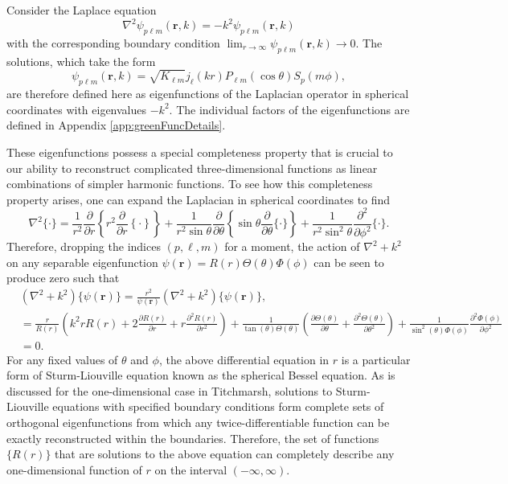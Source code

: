 \documentclass{article}
\begin{document}
Consider the Laplace equation
\begin{equation}
\nabla^2\psi_{p\ell m}(\mathbf{r},k) = -k^2\psi_{p\ell m}(\mathbf{r},k)
\end{equation}
with the corresponding boundary condition $\lim_{r\to\infty}\psi_{p\ell m}(\mathbf{r},k)\to0$. The solutions, which take the form
\begin{equation}
\psi_{p\ell m}(\mathbf{r},k) = \sqrt{K_{\ell m}}j_\ell(kr)P_{\ell m}(\cos\theta)S_p(m\phi),
\end{equation}
are therefore defined here as eigenfunctions of the Laplacian operator in spherical coordinates with eigenvalues $-k^2$. The individual factors of the eigenfunctions are defined in Appendix \ref{app:greenFuncDetails}. 

These eigenfunctions possess a special completeness property that is crucial to our ability to reconstruct complicated three-dimensional functions as linear combinations of simpler harmonic functions. To see how this completeness property arises, one can expand the Laplacian in spherical coordinates to find
\begin{equation}
\nabla^2\{\cdot\} = \frac{1}{r^2}\frac{\partial}{\partial r}\left\{r^2\frac{\partial}{\partial r}\left\{\cdot\right\}\right\} + \frac{1}{r^2\sin\theta}\frac{\partial}{\partial \theta}\left\{\sin\theta\frac{\partial}{\partial \theta}\{\cdot\}\right\} + \frac{1}{r^2\sin^2\theta}\frac{\partial^2}{\partial\phi^2}\{\cdot\}.
\end{equation}
Therefore, dropping the indices $(p,\ell,m)$ for a moment, the action of $\nabla^2 + k^2$ on any separable eigenfunction $\psi(\mathbf{r}) = R(r)\Theta(\theta)\Phi(\phi)$ can be seen to produce zero such that
\begin{equation}\label{eq:diffEqExpansion}
\begin{split}
&\left(\nabla^2 + k^2\right)\{\psi(\mathbf{r})\} = \frac{r^2}{\psi(\mathbf{r})}\left(\nabla^2 + k^2\right)\{\psi(\mathbf{r})\},\\
&= \frac{r}{R(r)}\left(k^2rR(r) + 2\frac{\partial R(r)}{\partial r} + r\frac{\partial^2 R(r)}{\partial r^2}\right) + \frac{1}{\tan(\theta)\Theta(\theta)}\left(\frac{\partial\Theta(\theta)}{\partial\theta} + \frac{\partial^2\Theta(\theta)}{\partial\theta^2}\right) + \frac{1}{\sin^2(\theta)\Phi(\phi)}\frac{\partial^2\Phi(\phi)}{\partial\phi^2}\\
&= 0.
\end{split}
\end{equation}
For any fixed values of $\theta$ and $\phi$, the above differential equation in $r$ is a particular form of Sturm-Liouville equation known as the spherical Bessel equation. As is discussed for the one-dimensional case in Titchmarsh,\cite{titchmarsh1946eigenfunction} solutions to Sturm-Liouville equations with specified boundary conditions form complete sets of orthogonal eigenfunctions from which any twice-differentiable function can be exactly reconstructed within the boundaries. Therefore, the set of functions $\{R(r)\}$ that are solutions to the above equation can completely describe any one-dimensional function of $r$ on the interval $(-\infty,\infty)$.
\end{document}
